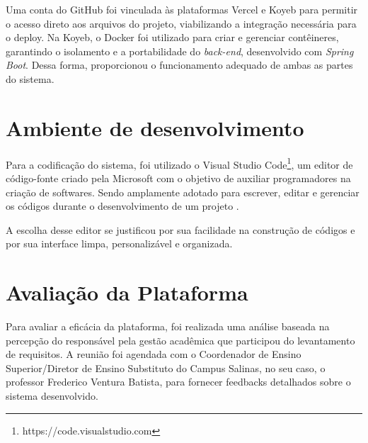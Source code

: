 Uma conta do GitHub foi vinculada às plataformas Vercel e Koyeb para permitir o acesso direto aos arquivos do projeto, viabilizando a integração necessária para o deploy. Na Koyeb, o Docker foi utilizado para criar e gerenciar contêineres, garantindo o isolamento e a portabilidade do \textit{back-end}, desenvolvido com \textit{Spring Boot}. Dessa forma, proporcionou o funcionamento adequado de ambas as partes do sistema.

\section{Ambiente de desenvolvimento}

Para a codificação do sistema, foi utilizado o Visual Studio Code\footnote{https://code.visualstudio.com}, um editor de código-fonte criado pela Microsoft com o objetivo de auxiliar programadores na criação de softwares. Sendo amplamente adotado para escrever, editar e gerenciar os códigos durante o desenvolvimento de um projeto \cite{silva2024biblioteca}.

A escolha desse editor se justificou por sua facilidade na construção de códigos e por sua interface limpa, personalizável e organizada.

\section{Avaliação da Plataforma}

Para avaliar a eficácia da plataforma, foi realizada uma análise baseada na percepção do responsável pela gestão acadêmica que participou do levantamento de requisitos. A reunião foi agendada com o Coordenador de Ensino Superior/Diretor de Ensino Substituto do Campus Salinas, no seu caso, o professor Frederico Ventura Batista, para fornecer feedbacks detalhados sobre o sistema desenvolvido.

